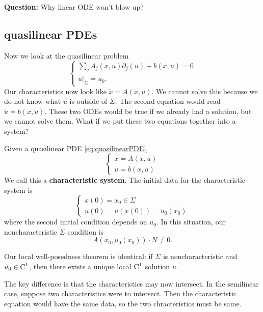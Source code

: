 \textbf{Question:} Why  linear ODE won't blow up?

\subsection{quasilinear PDEs}
Now we look at the quasilinear problem
\begin{equation}
    \label{eq:quasilinearPDE}
    \begin{cases}
        \sum_j A_j(x,u) \partial_j(u) + b(x,u) = 0\\
        u|_\Sigma = u_0.
    \end{cases}
\end{equation}
Our characteristics now look like $\dot x = A(x,u)$. We cannot solve this because we do not know what $u$ is outside of $\Sigma$. The second equation would read $\dot u = b(x,u)$. These two ODEs  would be true if we already had a solution, but we cannot solve them. What if we put these two equations together into a system? 

\begin{definition}
    Given a quasilinear PDE \eqref{eq:quasilinearPDE},
\[
    \begin{cases}
        \dot x = A(x,u)\\
        \dot u = b(x,u)
    \end{cases}
\]
We call this a \textbf{characteristic system}. The initial data for the characteristic system is 
\[
    \begin{cases}
        x(0) = x_0 \in \Sigma \\
        u(0) = u(x(0)) = u_0(x_0)
    \end{cases}
\]
where the second initial condition depends on $u_0$. In this situation, our noncharacteristic $\Sigma$ condition is 
\[
    A(x_0, u_0(x_0)) \cdot N \neq 0.
\]
\end{definition}

Our local well-posedness theorem is identical: if $\Sigma$ is noncharacteristic and $u_0\in \operatorname{C}^1$, then there exists a unique local $\operatorname{C}^1$ solution $u$.

The key difference is that the characteristics may now intersect. In the semilinear case, suppose two characteristics were to intersect. Then the characteristic equation would have the same data, so the two chracteristics must be same. 

\begin{figure}[H]
    \centering
{}
\end{figure}

